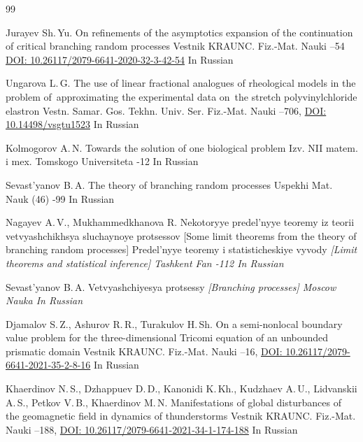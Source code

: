 \documentclass{mfitjournal-en}%
\begin{document}
\begin{thebibliography}{99}
	
\by Jurayev Sh.\,Yu.
\paper On refinements of the asymptotics expansion of the continuation of critical branching random processes
\jour Vestnik KRAUNC. Fiz.-Mat. Nauki
--54
\href{https://doi.org/10.26117/2079-6641-2020-32-3-42-54}{DOI: 10.26117/2079-6641-2020-32-3-42-54}
\lang In Russian


\by Ungarova L.\,G. 
\paper The use of linear fractional analogues of rheological models in the problem of~approximating the experimental data on~the stretch polyvinylchloride elastron
\jour Vestn. Samar. Gos. Tekhn. Univ. Ser. Fiz.-Mat. Nauki
--706,
\href{https://doi.org/10.14498/vsgtu1523}{DOI: 10.14498/vsgtu1523}
\lang In Russian

\by Kolmogorov A.\,N.  
\paper Towards the solution of one biological problem   
\jour Izv. NII matem. i mex. Tomskogo Universiteta 
-12
\lang In Russian


\by Sevast'yanov B.\,A. 
\paper The theory of branching random processes
\jour Uspekhi Mat. Nauk  
(46)
-99
\lang In Russian


\by Nagayev A.\,V., Mukhammedkhanova R.  
\paper Nekotoryye predel'nyye teoremy iz teorii vetvyashchikhsya sluchaynoye protsessov [Some limit theorems from the theory of branching random processes] 
\inbook  Predel'nyye teoremy i statisticheskiye vyvody \em{[Limit theorems and statistical inference]} 
\publaddr Tashkent
\publ Fan
-112
\lang In Russian

\by Sevast'yanov B.\,A. 
\book Vetvyashchiyesya protsessy \em{[Branching processes]}
\publaddr Moscow
\publ Nauka
\lang In Russian

\by Djamalov S.\,Z., Ashurov R.\,R., Turakulov H.\,Sh. 
\paper On a semi-nonlocal boundary value problem for the three-dimensional Tricomi equation of an unbounded prismatic domain
\jour Vestnik KRAUNC. Fiz.-Mat. Nauki
--16,
\href{https://doi.org/10.26117/2079-6641-2021-35-2-8-16}{DOI: 10.26117/2079-6641-2021-35-2-8-16}
\lang In Russian


\by Khaerdinov N.\,S., Dzhappuev D.\,D., Kanonidi K.\,Kh., Kudzhaev A.\,U., Lidvanskii A.\,S., Petkov V.\,B., Khaerdinov M.\,N.  
\paper Manifestations of global disturbances of the geomagnetic field in dynamics of thunderstorms
\jour Vestnik KRAUNC. Fiz.-Mat. Nauki
--188,
\href{https://doi.org/10.26117/2079-6641-2021-34-1-174-188}{DOI: 10.26117/2079-6641-2021-34-1-174-188}
\lang In Russian


\end{thebibliography}
\end{document}
